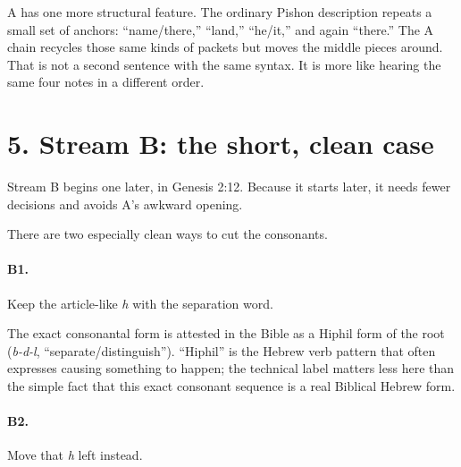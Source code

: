 A has one more structural feature. The ordinary Pishon description repeats a small set of anchors: ``name/there,'' ``land,'' ``he/it,'' and again ``there.'' The A chain recycles those same kinds of packets but moves the middle pieces around. That is not a second sentence with the same syntax. It is more like hearing the same four notes in a different order.

\section*{5. Stream B: the short, clean case}

Stream B begins one  later, in Genesis 2:12. Because it starts later, it needs fewer decisions and avoids A's awkward opening.

There are two especially clean ways to cut the consonants.

\paragraph{B1.} Keep the article-like \textit{h} with the separation word.


The exact consonantal form  is attested in the Bible as a Hiphil form of the root  (\textit{b-d-l}, ``separate/distinguish'').\cite{BDB,JouonMuraoka2006} ``Hiphil'' is the Hebrew verb pattern that often expresses causing something to happen; the technical label matters less here than the simple fact that this exact consonant sequence is a real Biblical Hebrew form.

\paragraph{B2.} Move that \textit{h} left instead.

